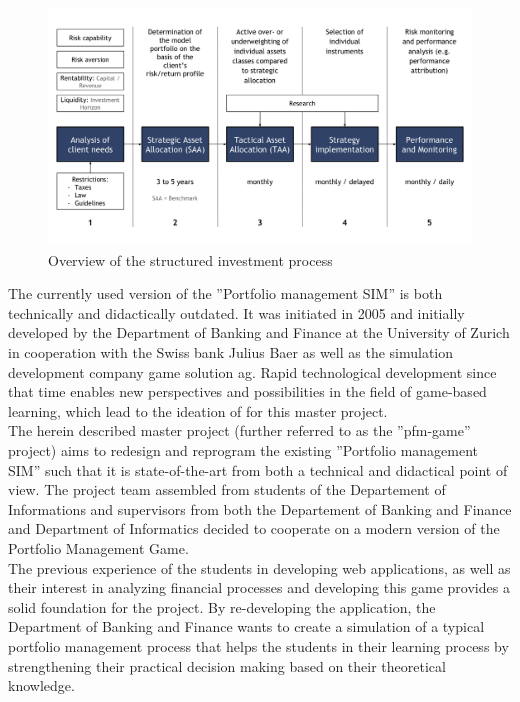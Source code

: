 \begin{figure}[h!]
  \centering
  \includegraphics[scale=0.6]{img/private_banking_process.png}
  \caption{Overview of the structured investment process}
  \label{fig:investment_process}
\end{figure}

The currently used version of the ''Portfolio management SIM'' is both technically and didactically outdated. It was initiated in 2005 and initially developed by the Department of Banking and Finance at the University of Zurich in cooperation with the Swiss bank Julius Baer as well as the simulation development company game solution ag. Rapid technological development since that time enables new perspectives and possibilities in the field of game-based learning, which lead to the ideation of for this master project. \\


The herein described master project (further referred to as the ''pfm-game'' project) aims to redesign and reprogram the existing ''Portfolio management SIM'' such that it is state-of-the-art from both a technical and didactical point of view. The project team assembled from students of the Departement of Informations and supervisors from both the Departement of Banking and Finance and Department of Informatics decided to cooperate on a modern version of the Portfolio Management Game. \\

The previous experience of the students in developing web applications, as well as their interest in analyzing financial processes and developing this game provides a solid foundation for the project. By re-developing the application, the Department of Banking and Finance wants to create a simulation of a typical portfolio management process that helps the students in their learning process by strengthening their practical decision making based on their theoretical knowledge. \\


